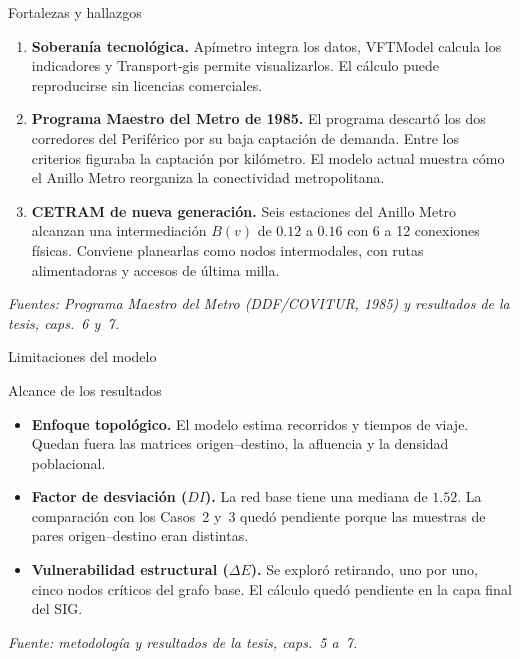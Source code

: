 \begin{frame}{Fortalezas y hallazgos}
  \begin{enumerate}
    \item \textbf{Soberanía tecnológica.}
          Apímetro integra los datos, VFTModel calcula los indicadores y
          Transport-gis permite visualizarlos. El cálculo puede reproducirse
          sin licencias comerciales.

    \item \textbf{Programa Maestro del Metro de 1985.}
          El programa descartó los dos corredores del Periférico por su baja
          captación de demanda. Entre los criterios figuraba la captación por
          kilómetro. El modelo actual muestra cómo el Anillo Metro reorganiza
          la conectividad metropolitana.

    \item \textbf{CETRAM de nueva generación.}
          Seis estaciones del Anillo Metro alcanzan una intermediación
          $B(v)$ de $0.12$ a $0.16$ con 6 a 12 conexiones físicas.
          Conviene planearlas como nodos intermodales, con rutas alimentadoras
          y accesos de última milla.
  \end{enumerate}

  \medskip
  {\footnotesize\itshape Fuentes: Programa Maestro del Metro (DDF/COVITUR, 1985)
    y resultados de la tesis, caps.~6 y~7.\par}
\end{frame}

\begin{frame}{Limitaciones del modelo}
  \begin{alertblock}{Alcance de los resultados}
    \begin{itemize}
      \item \textbf{Enfoque topológico.}
            El modelo estima recorridos y tiempos de viaje. Quedan fuera las
            matrices origen--destino, la afluencia y la densidad poblacional.

      \item \textbf{Factor de desviación ($DI$).}
            La red base tiene una mediana de $1.52$. La comparación con los
            Casos~2 y~3 quedó pendiente porque las muestras de pares
            origen--destino eran distintas.

      \item \textbf{Vulnerabilidad estructural ($\Delta E$).}
            Se exploró retirando, uno por uno, cinco nodos críticos del grafo
            base. El cálculo quedó pendiente en la capa final del SIG.
    \end{itemize}
  \end{alertblock}

  \medskip
  {\footnotesize\itshape Fuente: metodología y resultados de la tesis,
    caps.~5 a~7.\par}
\end{frame}

